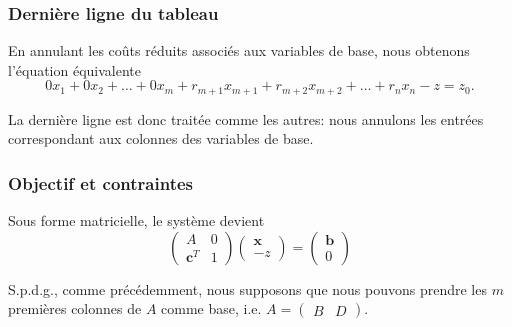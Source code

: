 \documentclass[t,usepdftitle=false]{beamer}
\def\bb{\boldsymbol{b}}
\def\bc{\boldsymbol{c}}
\def\bx{\boldsymbol{x}}
\begin{document}
\begin{frame}
\frametitle{Dernière ligne du tableau}

En annulant les coûts réduits associés aux variables de base, nous obtenons l'équation équivalente
$$
0x_1 + 0x_2 + \ldots + 0x_m + r_{m+1}x_{m+1} + r_{m+2}x_{m+2} + \ldots + r_nx_n - z = z_0.
$$	
	
\mbox{}
	
La dernière ligne est donc traitée comme les autres: nous annulons les entrées correspondant aux colonnes des variables de base.

\end{frame}

\begin{frame}
\frametitle{Objectif et contraintes}

Sous forme matricielle, le système devient
$$
\begin{pmatrix}
	A & 0 \\
	\bc^T & 1 
\end{pmatrix}
\begin{pmatrix}
	\bx \\
	-z 
\end{pmatrix}
=
\begin{pmatrix}
	\bb \\
	0
\end{pmatrix}
$$

S.p.d.g., comme précédemment, nous supposons que nous pouvons prendre les $m$ premières colonnes de $A$ comme base, i.e. $ A = \begin{pmatrix}
	B & D
\end{pmatrix}.$

\end{frame}
\end{document}
